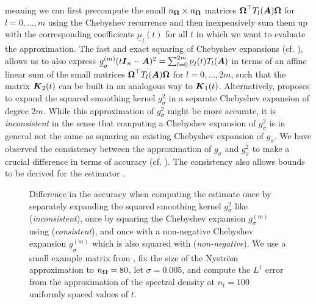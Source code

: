 meaning we can first precompute the small $n_{\boldsymbol{\Omega}} \times n_{\boldsymbol{\Omega}}$ matrices $\boldsymbol{\Omega}^{\top} T_l(\boldsymbol{A}) \boldsymbol{\Omega}$ for $l=0, \dots, m$ using the Chebyshev recurrence  and then inexpensively sum them up with the corresponding coefficients $\underline{\mu}_l(t)$ for all $t$ in which we want to evaluate the approximation. The fast and exact squaring of Chebyshev expansions (cf. ), allows us to also express $\underline{g}_{\sigma}^{(m)}(t \boldsymbol{I}_n - \boldsymbol{A})^2 = \sum_{l=0}^{2m} \underline{\nu}_l(t) T_l(\boldsymbol{A})$ in terms of an affine linear sum of the small matrices $\boldsymbol{\Omega}^{\top} T_l(\boldsymbol{A}) \boldsymbol{\Omega}$ for $l=0, \dots, 2m$, such that the matrix $\boldsymbol{K}_2(t)$ can be built in an analogous way to $\boldsymbol{K}_1(t)$. Alternatively, \cite{lin-2017-randomized-estimation} proposes to expand the squared smoothing kernel $g_{\sigma}^2$ in a separate Chebyshev expansion of degree $2m$. While this approximation of $g_{\sigma}^2$ might be more accurate, it is \emph{inconsistent} in the sense that computing a Chebyshev expansion of $g_{\sigma}^2$ is in general not the same as squaring an existing Chebyshev expansion of $g_{\sigma}$. We have observed the consistency between the approximation of $g_{\sigma}$ and $g_{\sigma}^2$ to make a crucial difference in terms of accuracy (cf. ). The consistency also allows bounds to be derived for the estimator .

\begin{figure}[ht]
    \centering
    
    \caption{Difference in the accuracy when computing the estimate  once by separately expanding the squared smoothing kernel $g_{\sigma}^2$ like \cite{lin-2017-randomized-estimation} (\emph{inconsistent}), once by squaring the Chebyshev expansion $g_{\sigma}^{(m)}$ using  (\emph{consistent}), and once with a non-negative Chebyshev expansion $\underline{g}_{\sigma}^{(m)}$  which is also squared with  (\emph{non-negative}). We use a small example matrix from , fix the size of the Nyström approximation to $n_{\boldsymbol{\Omega}} = 80$, let $\sigma = 0.005$, and compute the $L^1$ error from the approximation of the spectral density at $n_t = 100$ uniformly spaced values of $t$.}
    \label{fig:interpolation-issue}
\end{figure}

